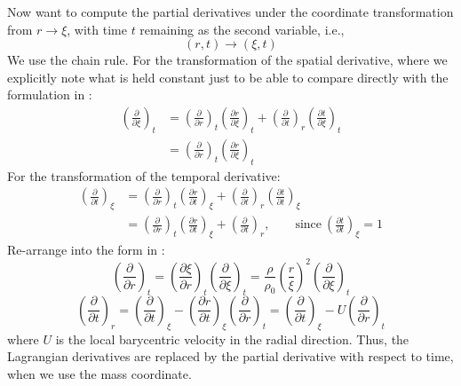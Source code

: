 Now want to compute the partial derivatives under the coordinate transformation from $r \rightarrow \xi$, with time $t$ remaining as the second variable, i.e.,
\begin{equation}
(r,t) \rightarrow (\xi,t)
\end{equation}
We use the chain rule.  For the transformation of the spatial derivative, where we explicitly note what is held constant just to be able to compare directly with the formulation in \cite{ABE95}:
\begin{align}
\left( \frac{\partial}{\partial \xi} \right)_t &= \left( \frac{\partial}{\partial r} \right)_t \left( \frac{\partial r}{\partial \xi} \right)_t + \left( \frac{\partial}{\partial t} \right)_r \left( \frac{\partial t}{\partial \xi} \right)_t\\
&= \left( \frac{\partial}{\partial r} \right)_t \left( \frac{\partial r}{\partial \xi} \right)_t
\end{align}
For the transformation of the temporal derivative:
\begin{align}
\left( \frac{\partial}{\partial t} \right)_\xi &= \left( \frac{\partial}{\partial r} \right)_t \left( \frac{\partial r}{\partial t} \right)_\xi + \left( \frac{\partial}{\partial t} \right)_r \left( \frac{\partial t}{\partial t} \right)_\xi\\
&= \left( \frac{\partial}{\partial r} \right)_t \left( \frac{\partial r}{\partial t} \right)_\xi + \left( \frac{\partial}{\partial t} \right)_r, \qquad \text{since}\ \left( \frac{\partial t}{\partial t}\right)_\xi=1
\end{align}
Re-arrange into the form in \cite{ABE95}:
\begin{equation}
\left( \frac{\partial}{\partial r} \right)_t = \left( \frac{\partial \xi}{\partial r} \right)_t \left( \frac{\partial}{\partial \xi} \right)_t = \frac{\rho}{\rho_0} \left( \frac{r}{\xi} \right)^2 \left(\frac{\partial}{\partial \xi} \right)_t
\label{eq:ddr}
\end{equation}
\begin{equation}
 \left( \frac{\partial}{\partial t} \right)_r  = \left( \frac{\partial}{\partial t} \right)_\xi - \left( \frac{\partial r}{\partial t} \right)_\xi  \left( \frac{\partial}{\partial r} \right)_t = \left( \frac{\partial}{\partial t} \right)_\xi - U  \left( \frac{\partial}{\partial r} \right)_t
\end{equation}
where $U$ is the local barycentric velocity in the radial direction.  Thus, the Lagrangian derivatives are replaced by the partial derivative with respect to time, when we use the mass coordinate.
